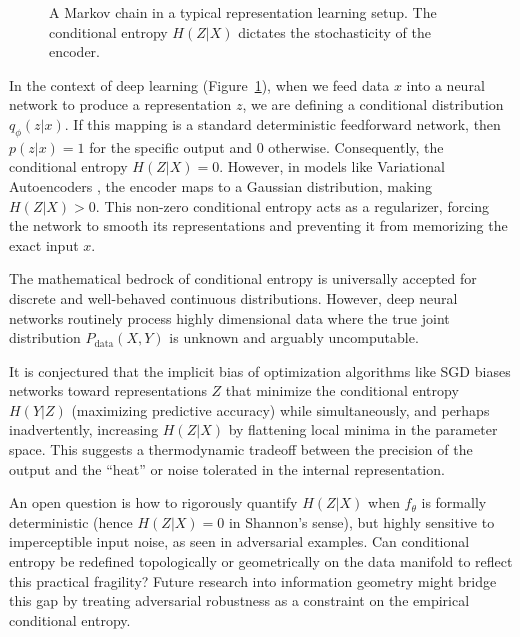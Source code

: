 \begin{figure}[ht]
    \centering
    \caption{A Markov chain in a typical representation learning setup. The conditional entropy $H(Z|X)$ dictates the stochasticity of the encoder.}
    \label{fig:markov_encoder}
\end{figure}

In the context of deep learning (Figure~\ref{fig:markov_encoder}), when we feed data $x$ into a neural network to produce a representation $z$, we are defining a conditional distribution $q_\phi(z|x)$. If this mapping is a standard deterministic feedforward network, then $p(z|x) = 1$ for the specific output and $0$ otherwise. Consequently, the conditional entropy $H(Z|X) = 0$. However, in models like Variational Autoencoders \cite{kingma2013auto}, the encoder maps to a Gaussian distribution, making $H(Z|X) > 0$. This non-zero conditional entropy acts as a regularizer, forcing the network to smooth its representations and preventing it from memorizing the exact input $x$.

\begin{horizon}
The mathematical bedrock of conditional entropy is universally accepted for discrete and well-behaved continuous distributions. However, deep neural networks routinely process highly dimensional data where the true joint distribution $P_{\text{data}}(X,Y)$ is unknown and arguably uncomputable. 

It is conjectured that the implicit bias of optimization algorithms like SGD biases networks toward representations $Z$ that minimize the conditional entropy $H(Y|Z)$ (maximizing predictive accuracy) while simultaneously, and perhaps inadvertently, increasing $H(Z|X)$ by flattening local minima in the parameter space. This suggests a thermodynamic tradeoff between the precision of the output and the ``heat'' or noise tolerated in the internal representation.

An open question is how to rigorously quantify $H(Z|X)$ when $f_\theta$ is formally deterministic (hence $H(Z|X)=0$ in Shannon's sense), but highly sensitive to imperceptible input noise, as seen in adversarial examples. Can conditional entropy be redefined topologically or geometrically on the data manifold to reflect this practical fragility? Future research into information geometry might bridge this gap by treating adversarial robustness as a constraint on the empirical conditional entropy.
\end{horizon}

